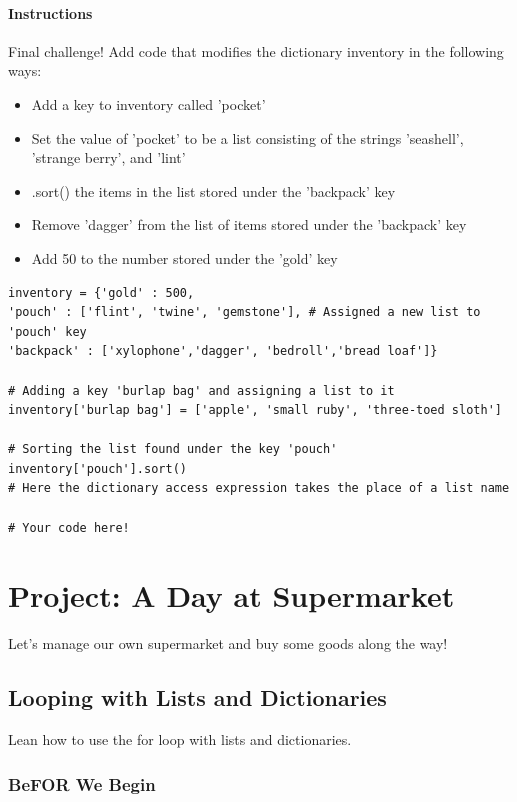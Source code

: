 \documentclass[12pt,a4paper,final,twoside,onecolumn,titlepage]{book}
\begin{document}
\subsubsection{Instructions}

Final challenge! Add code that modifies the dictionary inventory in the following ways:
\begin{itemize}
\item    Add a key to inventory called 'pocket'
\item    Set the value of 'pocket' to be a list consisting of the strings 'seashell', 'strange berry', and 'lint'
\item    .sort() the items in the list stored under the 'backpack' key
\item    Remove 'dagger' from the list of items stored under the 'backpack' key
\item    Add 50 to the number stored under the 'gold' key
\end{itemize}

\begin{lstlisting}
inventory = {'gold' : 500,
'pouch' : ['flint', 'twine', 'gemstone'], # Assigned a new list to 'pouch' key
'backpack' : ['xylophone','dagger', 'bedroll','bread loaf']}

# Adding a key 'burlap bag' and assigning a list to it
inventory['burlap bag'] = ['apple', 'small ruby', 'three-toed sloth']

# Sorting the list found under the key 'pouch'
inventory['pouch'].sort() 
# Here the dictionary access expression takes the place of a list name 

# Your code here!

\end{lstlisting}

\chapter{Project: A Day at Supermarket}
Let's manage our own supermarket and buy some goods along the way!

\section{Looping with Lists and Dictionaries}
Lean how to use the for loop with lists and dictionaries.
\subsection{BeFOR We Begin}
\end{document}
